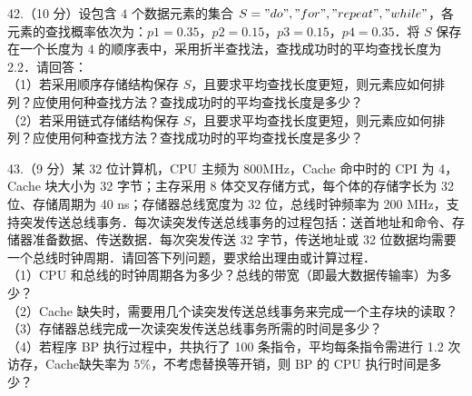 42.（10 分）设包含 $4$ 个数据元素的集合 $S={"do","for"," repeat"," while"}$，各元素的查找概率依次为：$p1=0.35$，$p2 = 0.15$，$p3=0.15$，$p4=0.35$．将 $S$ 保存在一个长度为 $4$ 的顺序表中，采用折半查找法，查找成功时的平均查找长度为2.2．请回答： \\
（1）若采用顺序存储结构保存 $S$，且要求平均查找长度更短，则元素应如何排列？应使用何种查找方法？查找成功时的平均查找长度是多少？ \\
（2）若采用链式存储结构保存 $S$，且要求平均查找长度更短，则元素应如何排列？应使用何种查找方法？查找成功时的平均查找长度是多少？

43.（9 分）某 32 位计算机，CPU 主频为 800MHz，Cache 命中时的 CPI 为 4，Cache 块大小为
32 字节；主存采用 8 体交叉存储方式，每个体的存储字长为 32 位、存储周期为 40 ns；存储器总线宽度为 32 位，总线时钟频率为 200 MHz，支持突发传送总线事务．每次读突发传送总线事务的过程包括：送首地址和命令、存储器准备数据、传送数据．每次突发传送 32 字节，传送地址或 32 位数据均需要一个总线时钟周期．请回答下列问题，要求给出理由或计算过程．  \\
（1）CPU 和总线的时钟周期各为多少？总线的带宽（即最大数据传输率）为多少？  \\
（2）Cache 缺失时，需要用几个读突发传送总线事务来完成一个主存块的读取？  \\
（3）存储器总线完成一次读突发传送总线事务所需的时间是多少？  \\
（4）若程序 BP 执行过程中，共执行了 100 条指令，平均每条指令需进行 1.2 次访存，Cache缺失率为 5\%，不考虑替换等开销，则 BP 的 CPU 执行时间是多少？ 

